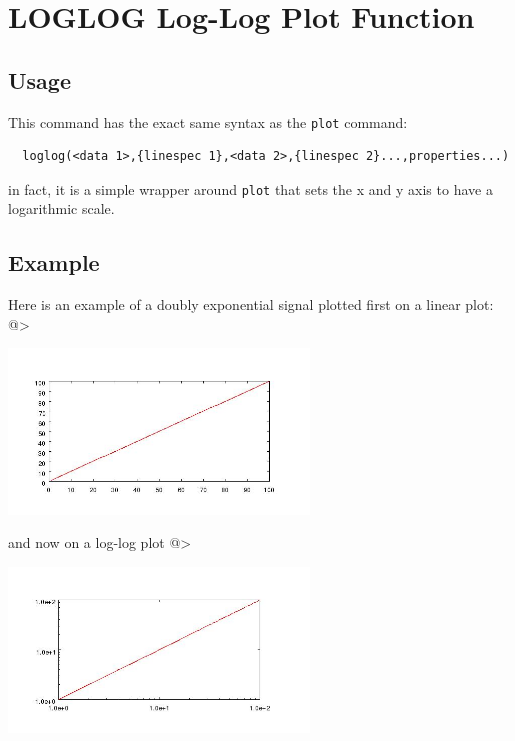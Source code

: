\section{LOGLOG Log-Log Plot Function}

\subsection{Usage}

This command has the exact same syntax as the \verb|plot| command:
\begin{verbatim}
  loglog(<data 1>,{linespec 1},<data 2>,{linespec 2}...,properties...)
\end{verbatim}
in fact, it is a simple wrapper around \verb|plot| that sets the
x and y axis to have a logarithmic scale.
\subsection{Example}

Here is an example of a doubly exponential signal plotted first on a linear
plot:
@>


\centerline{\includegraphics[width=8cm]{loglog1}}

and now on a log-log plot
@>


\centerline{\includegraphics[width=8cm]{loglog2}}

